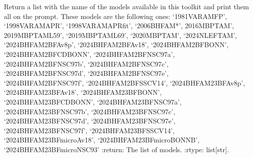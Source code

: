 \documentclass[letterpaper,10pt,english]{sphinxmanual}
\begin{document}
\begin{fulllineitems}
\label{\detokenize{source/api/setup_matter_micro_esym:nucleardatapy.matter.setup_micro_esym.micro_esym_models}}
\pysigstartsignatures
{}
\pysigstopsignatures
\sphinxAtStartPar
Return a list with the name of the models available in this toolkit and     print them all on the prompt. These models are the following ones:     ‘1981\sphinxhyphen{}VAR\sphinxhyphen{}AM\sphinxhyphen{}FP’, ‘1998\sphinxhyphen{}VAR\sphinxhyphen{}AM\sphinxhyphen{}APR’, ‘1998\sphinxhyphen{}VAR\sphinxhyphen{}AM\sphinxhyphen{}APR\sphinxhyphen{}fit’, ‘2006\sphinxhyphen{}BHF\sphinxhyphen{}AM*’,     2016\sphinxhyphen{}MBPT\sphinxhyphen{}AM’, 2019\sphinxhyphen{}MBPT\sphinxhyphen{}AM\sphinxhyphen{}L59’, ‘2019\sphinxhyphen{}MBPT\sphinxhyphen{}AM\sphinxhyphen{}L69’,     ‘2020\sphinxhyphen{}MBPT\sphinxhyphen{}AM’, ‘2024\sphinxhyphen{}NLEFT\sphinxhyphen{}AM’,     ‘2024\sphinxhyphen{}BHF\sphinxhyphen{}AM\sphinxhyphen{}2BF\sphinxhyphen{}Av8p’, ‘2024\sphinxhyphen{}BHF\sphinxhyphen{}AM\sphinxhyphen{}2BF\sphinxhyphen{}Av18’, ‘2024\sphinxhyphen{}BHF\sphinxhyphen{}AM\sphinxhyphen{}2BF\sphinxhyphen{}BONN’, ‘2024\sphinxhyphen{}BHF\sphinxhyphen{}AM\sphinxhyphen{}2BF\sphinxhyphen{}CDBONN’,     ‘2024\sphinxhyphen{}BHF\sphinxhyphen{}AM\sphinxhyphen{}2BF\sphinxhyphen{}NSC97a’, ‘2024\sphinxhyphen{}BHF\sphinxhyphen{}AM\sphinxhyphen{}2BF\sphinxhyphen{}NSC97b’, ‘2024\sphinxhyphen{}BHF\sphinxhyphen{}AM\sphinxhyphen{}2BF\sphinxhyphen{}NSC97c’, ‘2024\sphinxhyphen{}BHF\sphinxhyphen{}AM\sphinxhyphen{}2BF\sphinxhyphen{}NSC97d’,     ‘2024\sphinxhyphen{}BHF\sphinxhyphen{}AM\sphinxhyphen{}2BF\sphinxhyphen{}NSC97e’, ‘2024\sphinxhyphen{}BHF\sphinxhyphen{}AM\sphinxhyphen{}2BF\sphinxhyphen{}NSC97f’, ‘2024\sphinxhyphen{}BHF\sphinxhyphen{}AM\sphinxhyphen{}2BF\sphinxhyphen{}SSCV14’,    ‘2024\sphinxhyphen{}BHF\sphinxhyphen{}AM\sphinxhyphen{}23BF\sphinxhyphen{}Av8p’, ‘2024\sphinxhyphen{}BHF\sphinxhyphen{}AM\sphinxhyphen{}23BF\sphinxhyphen{}Av18’, ‘2024\sphinxhyphen{}BHF\sphinxhyphen{}AM\sphinxhyphen{}23BF\sphinxhyphen{}BONN’, ‘2024\sphinxhyphen{}BHF\sphinxhyphen{}AM\sphinxhyphen{}23BF\sphinxhyphen{}CDBONN’,     ‘2024\sphinxhyphen{}BHF\sphinxhyphen{}AM\sphinxhyphen{}23BF\sphinxhyphen{}NSC97a’, ‘2024\sphinxhyphen{}BHF\sphinxhyphen{}AM\sphinxhyphen{}23BF\sphinxhyphen{}NSC97b’, ‘2024\sphinxhyphen{}BHF\sphinxhyphen{}AM\sphinxhyphen{}23BF\sphinxhyphen{}NSC97c’, ‘2024\sphinxhyphen{}BHF\sphinxhyphen{}AM\sphinxhyphen{}23BF\sphinxhyphen{}NSC97d’,     ‘2024\sphinxhyphen{}BHF\sphinxhyphen{}AM\sphinxhyphen{}23BF\sphinxhyphen{}NSC97e’, ‘2024\sphinxhyphen{}BHF\sphinxhyphen{}AM\sphinxhyphen{}23BF\sphinxhyphen{}NSC97f’, ‘2024\sphinxhyphen{}BHF\sphinxhyphen{}AM\sphinxhyphen{}23BF\sphinxhyphen{}SSCV14’,    ‘2024\sphinxhyphen{}BHF\sphinxhyphen{}AM\sphinxhyphen{}23BFmicro\sphinxhyphen{}Av18’, ‘2024\sphinxhyphen{}BHF\sphinxhyphen{}AM\sphinxhyphen{}23BFmicro\sphinxhyphen{}BONNB’, ‘2024\sphinxhyphen{}BHF\sphinxhyphen{}AM\sphinxhyphen{}23BFmicro\sphinxhyphen{}NSC93’
:return: The list of models.
:rtype: list{[}str{]}.

\end{fulllineitems}
\end{document}
